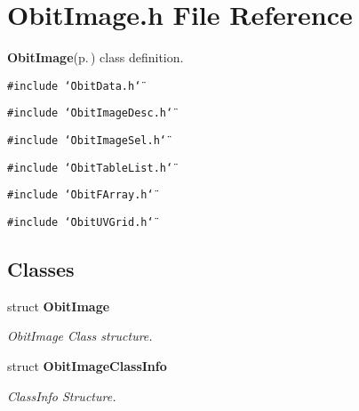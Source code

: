 \section{Obit\-Image.h File Reference}
\label{ObitImage_8h}
{\bf Obit\-Image}{\rm (p.\,\pageref{structObitImage})} class definition. 

{\tt \#include \char`\"{}Obit\-Data.h\char`\"{}}\par
{\tt \#include \char`\"{}Obit\-Image\-Desc.h\char`\"{}}\par
{\tt \#include \char`\"{}Obit\-Image\-Sel.h\char`\"{}}\par
{\tt \#include \char`\"{}Obit\-Table\-List.h\char`\"{}}\par
{\tt \#include \char`\"{}Obit\-FArray.h\char`\"{}}\par
{\tt \#include \char`\"{}Obit\-UVGrid.h\char`\"{}}\par
\subsection*{Classes}
\begin{CompactItemize}
\item 
struct {\bf Obit\-Image}
\begin{CompactList}\small\item\em Obit\-Image Class structure. \item\end{CompactList}\item 
struct {\bf Obit\-Image\-Class\-Info}
\begin{CompactList}\small\item\em Class\-Info Structure. \item\end{CompactList}\end{CompactItemize}
